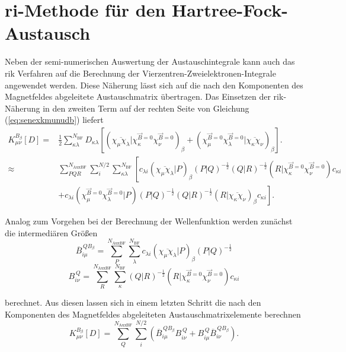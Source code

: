 \section{\ac{ri}-Methode für den Hartree-Fock-Austausch}
Neben der semi-numerischen Auswertung der Austauschintegrale kann auch das \ac{rik} Verfahren auf die Berechnung der Vierzentren-Zweielektronen-Integrale angewendet werden.\supercite{weigend2002fully} Diese Näherung lässt sich auf die nach den Komponenten des Magnetfeldes abgeleitete Austauschmatrix übertragen. Das Einsetzen der \ac{rik}-Näherung in den zweiten Term auf der rechten Seite von Gleichung (\ref{eq:senexkmunudb}) liefert
\begin{equation}
\begin{aligned}
K_{\mu\nu}^{B_\beta}[D]=&\frac{1}{2}\sum_{\kappa\lambda}^{N_{\textrm{BF}}}D_{\kappa\lambda} \left[\left(\overline{\chi_\mu\chi_\lambda}\vert\chi_\kappa^{\vec{B}=0}\chi_\nu^{\vec{B}=0}\right)_\beta+\left(\chi_\mu^{\vec{B}=0}\chi_\lambda^{\vec{B}=0}\vert\overline{\chi_\kappa\chi_\nu}\right)_\beta\right].\\
\approx& \sum_{PQR}^{N_{\text{AuxBF}}}\sum_i^{N/2}\sum_{\kappa\lambda}^{N_{\textrm{BF}}}\left[ c_{\lambda i} \left(\overline{\chi_\mu\chi_\lambda}\vert P\right)_\beta\left(P\vert Q\right)^{-\frac{1}{2}} \left(Q\vert R\right)^{-\frac{1}{2}} \left(R \vert\chi_\kappa^{\vec{B}=0}\chi_\nu^{\vec{B}=0}\right)c_{\kappa i} \right.\\
&\left.+c_{\lambda i}\left(\chi_\mu^{\vec{B}=0}\chi_\lambda^{\vec{B}=0}\vert P\right)\left(P\vert Q\right)^{-\frac{1}{2}} \left(Q\vert R\right)^{-\frac{1}{2}} \left(R\vert\overline{\chi_\kappa\chi_\nu}\right)_\beta c_{\kappa i}\right].
\end{aligned}
\end{equation}

Analog zum Vorgehen bei der Berechnung der Wellenfunktion werden zunächst die intermediären Größen 
\begin{equation}
\overline{B}_{i\mu}^{\,QB_\beta}=\sum_P^{N_{\text{AuxBF}}}\sum_{\lambda}^{N_{\textrm{BF}}}c_{\lambda i} \left(\overline{\chi_\mu\chi_\lambda}\vert P\right)_\beta\left(P\vert Q\right)^{-\frac{1}{2}}
\end{equation}
\begin{equation}
B_{i\nu}^{\,Q}=\sum_R^{N_{\text{AuxBF}}}\sum_{\kappa}^{N_{\textrm{BF}}}\left(Q\vert R\right)^{-\frac{1}{2}} \left(R \vert\chi_\kappa^{\vec{B}=0}\chi_\nu^{\vec{B}=0}\right)c_{\kappa i}
\end{equation}

berechnet. Aus diesen lassen sich in einem letzten Schritt die nach den Komponenten des Magnetfeldes abgeleiteten Austauschmatrixelemente berechnen
\begin{equation}
K_{\mu\nu}^{B_\beta}[D]=\sum_Q^{N_{\text{AuxBF}}}\sum_i^{N/2}\left(\overline{B}_{i\mu}^{\,QB_\beta} B_{i\nu}^{\,Q}+B_{i\mu}^{\,Q}\overline{B}_{i\nu}^{\,QB_\beta}\right).
\end{equation}